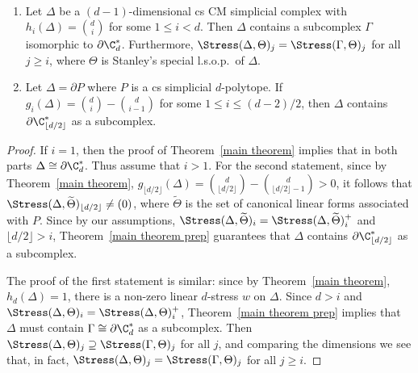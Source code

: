 \begin{coro} \ \samepage
\begin{enumerate}
\item Let $\Delta$ be a $(d-1)$-dimensional cs CM simplicial complex with $h_i(\Delta)=\binom{d}{i}$ for some $1\leq i <d$. Then $\Delta$ contains a subcomplex $\Gamma$ isomorphic to $\partial\C^*_d$. Furthermore, $\Stress(\Delta, \Theta)_j=\Stress(\Gamma, \Theta)_j$ for all $j\geq i$, where $\Theta$ is Stanley's special l.s.o.p.~of $\Delta$. 
\item Let $\Delta=\partial P$ where $P$ is a cs simplicial $d$-polytope. If $g_i(\Delta)=\binom{d}{i}-\binom{d}{i-1}$ for some $1\leq i \leq (d-2)/2$, then $\Delta$ contains $\partial\C^*_{\lfloor d/2\rfloor}$ as a subcomplex. 
\end{enumerate}
\end{coro}
\begin{proof}
	If $i=1$, then the proof of Theorem~\ref{main theorem} implies that in both parts $\Delta\cong\partial\C^*_d$. Thus assume that $i>1$. For the second statement, since by Theorem~\ref{main theorem},	$g_{\lfloor d/2\rfloor}(\Delta)=\binom{d}{\lfloor d/2\rfloor}-\binom{d}{\lfloor d/2\rfloor-1}>0$, it follows that $\Stress(\Delta, \widetilde{\Theta})_{\lfloor d/2\rfloor}\neq (0)$, where $\widetilde{\Theta}$ is the set of canonical linear forms associated with $P$. Since by our assumptions, $\Stress(\Delta,\widetilde{\Theta})_i=\Stress(\Delta,\widetilde{\Theta})^+_i$ and $\lfloor d/2\rfloor >i$, Theorem~\ref{main theorem prep} guarantees that $\Delta$ contains $\partial\C^*_{\lfloor d/2\rfloor}$ as a subcomplex.

	
The proof of the first statement is similar: since by Theorem~\ref{main theorem}, $h_d(\Delta)=1$, there is a non-zero linear $d$-stress $w$ on $\Delta$. Since $d>i$ and $\Stress(\Delta,\Theta)_i=\Stress(\Delta,\Theta)^+_i$, Theorem~\ref{main theorem prep} implies that $\Delta$ must contain $\Gamma\cong\partial\C^*_d$ as a subcomplex. Then $\Stress(\Delta, \Theta)_j\supseteq\Stress(\Gamma, \Theta)_j$ for all $j$, and comparing the dimensions we see that, in fact, $\Stress(\Delta, \Theta)_j=\Stress(\Gamma,\Theta)_j$ for all $j\geq i$.
\end{proof}


